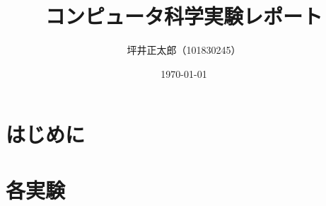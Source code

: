 \documentclass[a4paper,15pt]{jsarticle}
\begin{document}
\title{コンピュータ科学実験レポート}
\author{坪井正太郎（101830245）}
\date{\today}
\maketitle

\section*{はじめに}




\section*{各実験}






\end{document}
